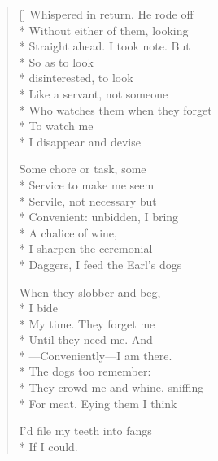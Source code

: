 \begin{verse}[\versewidth]
Whispered in return. He rode off\\*
Without either of them, looking\\*
Straight ahead. I took note.  But\\*
So as to look\\*
\hspace*{3\vgap} disinterested, to look\\*
Like a servant, not someone\\*
Who watches them when they forget\\*
To watch me\\*
\hspace*{3\vgap} I disappear and devise

Some chore or task, some\\*
Service to make me seem\\*
Servile, not necessary but\\*
Convenient: unbidden, I bring\\*
A chalice of wine,\\*
I sharpen the ceremonial\\*
Daggers, I feed the Earl's dogs

When they slobber and beg,\\*
\hspace*{3\vgap} I bide\\*
My time. They forget me\\*
Until they need me. And\\*
---Conveniently---I am there.\\*
The dogs too remember:\\*
They crowd me and whine, sniffing\\*
For meat.  Eying them I think

I'd file my teeth into fangs\\*
If I could.
\end{verse}
